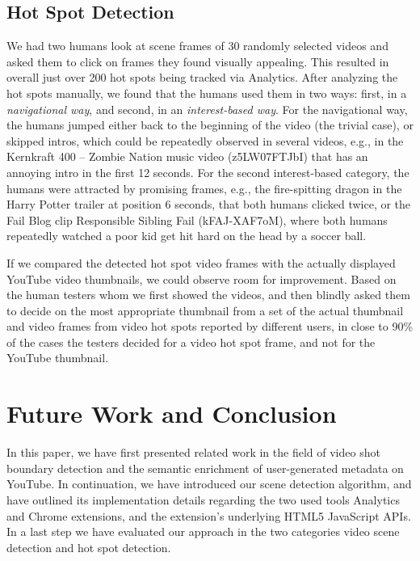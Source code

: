 \documentclass[10pt,twocolumn,letterpaper]{article}
\begin{document}
\subsection{Hot Spot Detection}
We had two humans look at scene frames of 30 randomly selected videos and asked them to click on frames they found visually appealing. This resulted in overall just over 200 hot spots being tracked via Analytics. After analyzing the hot spots manually, we found that the humans used them in two ways: first, in a \emph{navigational way}, and second, in an \emph{interest-based way}. For the navigational way, the humans jumped either back to the beginning of the video (the trivial case), or skipped intros, which could be repeatedly observed in several videos, e.g., in the Kernkraft 400 -- Zombie Nation music video (z5LW07FTJbI) that has an annoying intro in the first 12 seconds. For the second interest-based category, the humans were attracted by promising frames, e.g., the fire-spitting dragon in the Harry Potter trailer at position 6 seconds, that both humans clicked twice, or the Fail Blog clip Responsible Sibling Fail (kFAJ-XAF7oM), where both humans repeatedly watched a poor kid get hit hard on the head by a soccer ball.

If we compared the detected hot spot video frames with the actually displayed YouTube video thumbnails, we could observe room for improvement. Based on the human testers whom we first showed the videos, and then blindly asked them to decide on the most appropriate thumbnail from a set of the actual thumbnail and video frames from video hot spots reported by different users, in close to 90\% of the cases the testers decided for a video hot spot frame, and not for the YouTube thumbnail. 

\section{Future Work and Conclusion} \label{sec:future-work-conclusion}
In this paper, we have first presented related work in the field of video shot boundary detection and the semantic enrichment of user-generated metadata on YouTube. In continuation, we have introduced our scene detection algorithm, and have outlined its implementation details regarding the two used tools Analytics and Chrome extensions, and the extension's underlying HTML5 JavaScript APIs. In a last step we have evaluated our approach in the two categories video scene detection and hot spot detection.
\end{document}
